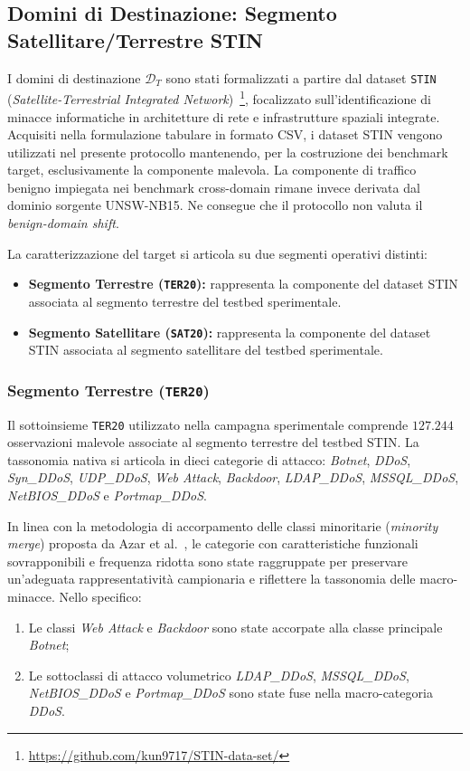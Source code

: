 \subsection{Domini di Destinazione: Segmento Satellitare/Terrestre STIN}
\label{subsec:dataset_target}

I domini di destinazione $\mathcal{D}_T$ sono stati formalizzati a partire dal dataset \texttt{STIN} (\textit{Satellite-Terrestrial Integrated Network})~\cite{stin}\footnote{\url{https://github.com/kun9717/STIN-data-set/}}, focalizzato sull'identificazione di minacce informatiche in architetture di rete e infrastrutture spaziali integrate. 
Acquisiti nella formulazione tabulare in formato CSV, i dataset STIN vengono utilizzati nel presente protocollo mantenendo, per la costruzione dei benchmark target, esclusivamente la componente malevola. 
La componente di traffico benigno impiegata nei benchmark cross-domain rimane invece derivata dal dominio sorgente UNSW-NB15.
Ne consegue che il protocollo non valuta il \textit{benign-domain shift}.

La caratterizzazione del target si articola su due segmenti operativi distinti:
\begin{itemize}
    \item \textbf{Segmento Terrestre (\texttt{TER20}):} rappresenta la componente del dataset STIN associata al segmento terrestre del testbed sperimentale.
    \item \textbf{Segmento Satellitare (\texttt{SAT20}):} rappresenta la componente del dataset STIN associata al segmento satellitare del testbed sperimentale.
\end{itemize}

\subsubsection{Segmento Terrestre (\texttt{TER20})}
Il sottoinsieme \texttt{TER20} utilizzato nella campagna sperimentale comprende $127.244$ osservazioni malevole associate al segmento terrestre del testbed STIN.
La tassonomia nativa si articola in dieci categorie di attacco: \textit{Botnet}, \textit{DDoS}, \textit{Syn\_DDoS}, \textit{UDP\_DDoS}, \textit{Web Attack}, \textit{Backdoor}, \textit{LDAP\_DDoS}, \textit{MSSQL\_DDoS}, \textit{NetBIOS\_DDoS} e \textit{Portmap\_DDoS}.

In linea con la metodologia di accorpamento delle classi minoritarie (\textit{minority merge}) proposta da Azar et al.~\cite{azar2023}, le categorie con caratteristiche funzionali sovrapponibili e frequenza ridotta sono state raggruppate per preservare un'adeguata rappresentatività campionaria e riflettere la tassonomia delle macro-minacce. 
Nello specifico:
\begin{enumerate}
    \item Le classi \textit{Web Attack} e \textit{Backdoor} sono state accorpate alla classe principale \textit{Botnet};
    \item Le sottoclassi di attacco volumetrico \textit{LDAP\_DDoS}, \textit{MSSQL\_DDoS}, \textit{NetBIOS\_DDoS} e \textit{Portmap\_DDoS} sono state fuse nella macro-categoria \textit{DDoS}.
\end{enumerate}


